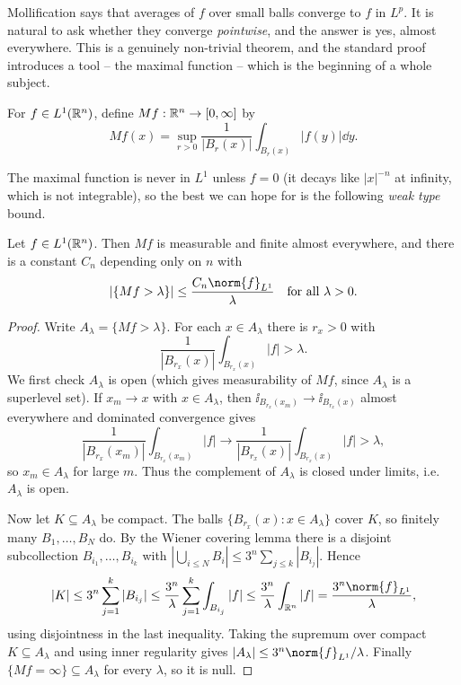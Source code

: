 \documentclass[a4paper]{scrartcl}
\begin{document}
Mollification says that averages of $f$ over small balls converge to $f$ in $L^p$. It is natural to ask whether they converge \emph{pointwise}, and the answer is yes, almost everywhere. This is a genuinely non-trivial theorem, and the standard proof introduces a tool -- the maximal function -- which is the beginning of a whole subject.

\begin{definition}
	For $f \in L^1(\mathbb{R}^n)$, define $Mf : \mathbb{R}^n \to [0,\infty]$ by
	$$Mf(x) = \sup_{r > 0} \frac{1}{|B_r(x)|} \int_{B_r(x)} |f(y)| \dd y.$$
\end{definition}

The maximal function is never in $L^1$ unless $f = 0$ (it decays like $|x|^{-n}$ at infinity, which is not integrable), so the best we can hope for is the following \emph{weak type} bound.

\begin{lemma}\label{lem:maximal}
	Let $f \in L^1(\mathbb{R}^n)$. Then $Mf$ is measurable and finite almost everywhere, and there is a constant $C_n$ depending only on $n$ with
	$$\left| \{ Mf > \lambda\}\right| \le \frac{C_n \norm{f}_{L^1}}{\lambda} \quad \text{for all } \lambda > 0.$$
\end{lemma}

\begin{proof}
	Write $A_\lambda = \{Mf > \lambda\}$. For each $x \in A_\lambda$ there is $r_x > 0$ with
	$$\frac{1}{|B_{r_x}(x)|}\int_{B_{r_x}(x)} |f| > \lambda.$$
	We first check $A_\lambda$ is open (which gives measurability of $Mf$, since $A_\lambda$ is a superlevel set). If $x_m \to x$ with $x \in A_\lambda$, then $\ii_{B_{r_x}(x_m)} \to \ii_{B_{r_x}(x)}$ almost everywhere and dominated convergence gives
	$$\frac{1}{|B_{r_x}(x_m)|}\int_{B_{r_x}(x_m)} |f| \longrightarrow \frac{1}{|B_{r_x}(x)|}\int_{B_{r_x}(x)}|f| > \lambda,$$
	so $x_m \in A_\lambda$ for large $m$. Thus the complement of $A_\lambda$ is closed under limits, i.e.\ $A_\lambda$ is open.

	Now let $K \subseteq A_\lambda$ be compact. The balls $\{B_{r_x}(x) : x \in A_\lambda\}$ cover $K$, so finitely many $B_1, \dots, B_N$ do. By the Wiener covering lemma there is a disjoint subcollection $B_{i_1}, \dots, B_{i_k}$ with $\left| \bigcup_{i \le N} B_i \right| \le 3^n \sum_{j \le k} |B_{i_j}|$. Hence
	$$|K| \le 3^n \sum_{j=1}^k |B_{i_j}| \le \frac{3^n}{\lambda}\sum_{j=1}^k \int_{B_{i_j}}|f| \le \frac{3^n}{\lambda}\int_{\R^n}|f| = \frac{3^n \norm{f}_{L^1}}{\lambda},$$
	using disjointness in the last inequality. Taking the supremum over compact $K \subseteq A_\lambda$ and using inner regularity gives $|A_\lambda| \le 3^n \norm{f}_{L^1}/\lambda$. Finally $\{Mf = \infty\} \subseteq A_\lambda$ for every $\lambda$, so it is null.
\end{proof}
\end{document}
